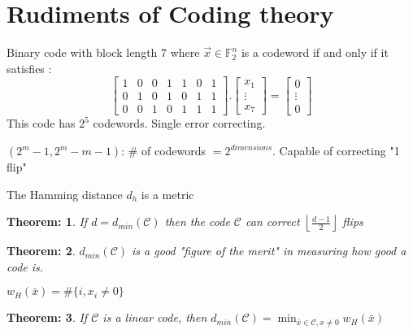 \documentclass[11pt, a4paper]{scrartcl}
\newtheorem{theorem}{Theorem:}[section]
\newenvironment{definition}[1][Definition]{\begin{trivlist}
\item[\hskip \labelsep {\bfseries #1}]}{\end{trivlist}}
\newenvironment{example}[1][Example]{\begin{trivlist}
\item[\hskip \labelsep {\bfseries #1}]}{\end{trivlist}}
\newenvironment{remark}[1][Remark]{\begin{trivlist}
\item[\hskip \labelsep {\bfseries #1}]}{\end{trivlist}}
\begin{document}
\section{Rudiments of Coding theory}

\begin{example}[$(7,4)$ Hamming Code] Binary code with block length 7 where $\vec x \in \mathbb F_2^n$ is a codeword if and only if it satisfies : 
$$\begin{bmatrix} 1 & 0 & 0 & 1 & 1 & 0 & 1\\ 0 & 1 & 0 & 1 & 0 & 1 & 1\\ 0 & 0 & 1 & 0 & 1 & 1 & 1 \end{bmatrix}.\begin{bmatrix} x_1\\ \vdots \\ x_7\end{bmatrix} =  \begin{bmatrix} 0\\ \vdots \\ 0\end{bmatrix} $$
This code has $2^5$ codewords. Single error correcting. 
\end{example}

\begin{example}[Hamming codes] $(2^m-1, 2^m-m-1)$: \# of codewords $= 2^{dimensions}$. Capable of correcting "1 flip"
\end{example}

\begin{remark} The Hamming distance $d_h$ is a metric \end{remark}

\begin{theorem} If $d=d_{min} (\mathcal C)$ then the code $\mathcal C$ can correct $\left \lfloor \frac {d-1}{2} \right \rfloor$ flips
\end{theorem}

\begin{theorem} $d_{min} (\mathcal C)$ is a good "figure of the merit" in measuring how good a code is. 
\end{theorem}

\begin{definition}[Hamming weight of a sequence $\bar x$] $w_H(\bar x) = \# \{i, x_i\neq 0 \}$
\end{definition}

\begin{theorem} If $\mathcal C$ is a linear code, then $d_{min} (\mathcal C) = \min_{\bar x \in \mathcal C, x\neq 0} w_H(\bar x)$
\end{theorem}
\end{document}
